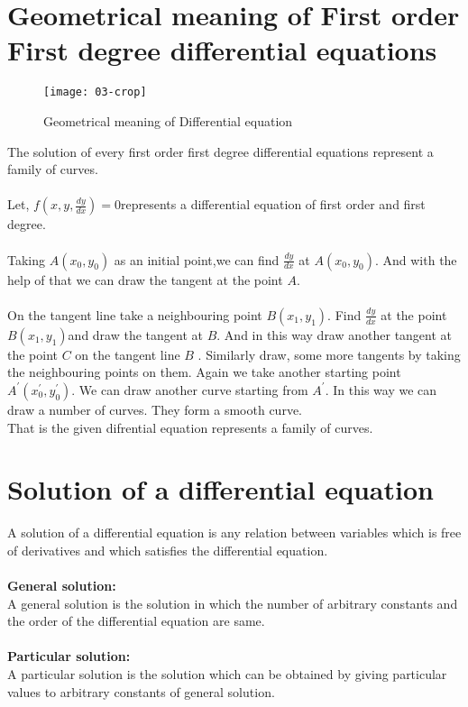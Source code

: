 \section{Geometrical meaning of First order First degree differential equations}
\begin{wrapfigure}{r}{0.5\textwidth}
	\begin{center}
		\texttt{[image: 03-crop]}
	\end{center}
	\caption{Geometrical meaning of Differential equation}
\end{wrapfigure}
The solution of every  first order first degree differential equations represent a family of curves.
\\\\Let, $f\left(x, y, \frac{d y}{d x}\right)=0$\quad  represents a differential equation of  first order and first degree.\\\\
Taking $A\left(x_{0}, y_{0}\right)$ as an initial point,we
can find $\frac{d y}{d x}$ at $A\left(x_{0}, y_{0}\right)$. And with the help of that we can draw the tangent at the point $A$.\\\\
On the tangent line take a neighbouring point $B\left(x_{1}, y_{1}\right)$. Find $\frac{d y}{d x}$ at the point $B\left(x_{1}, y_{1}\right)$and draw the tangent at $B$. And in this way draw another tangent at the point $C$ on the tangent line $B$ . Similarly draw, some more tangents by taking the neighbouring points on them. Again we take another starting point $A^{\prime}\left(x_{0}^{\prime}, y_{0}^{\prime}\right)$. We can draw another curve starting from
$A^{\prime} .$ In this way we can draw a number of curves. They form a smooth curve. \\
That is the given difrential equation represents a family of curves.

\section{Solution of a differential equation}
A solution of a differential equation is any relation
between variables which is free of derivatives and which
satisfies the differential equation.\\\\
\textbf{General solution:}\\ A general solution is the solution in which the number
of arbitrary constants and the order of the differential
equation are same.\\\\
\textbf{Particular solution:}\\ A particular solution is the solution which can be
obtained by giving particular values to arbitrary constants of general solution.

